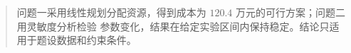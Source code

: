 \begin{abstract}
问题一采用线性规划分配资源，得到成本为 $120.4$ 万元的可行方案；问题二用灵敏度分析检验
参数变化，结果在给定实验区间内保持稳定。结论只适用于题设数据和约束条件。

\end{abstract}
